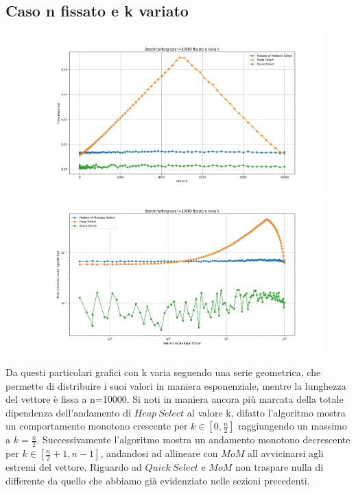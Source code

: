 \documentclass[a4paper]{article}
\begin{document}
\subsection{Caso n fissato e k variato}
\begin{figure}[h]
    \centering
    \includegraphics[width=.83\textwidth]{graphs/n_fisso/np.png}
    \includegraphics[width=.83\textwidth]{graphs/n_fisso/np2.png}
\end{figure}
Da questi particolari grafici con k varia seguendo una serie geometrica, che permette di distribuire i suoi valori in maniera esponenziale, mentre la lunghezza del vettore è fissa a n=10000. Si noti in maniera ancora più marcata della totale dipendenza dell'andamento di $Heap\ Select$ al valore k, difatto l'algoritmo mostra un comportamento monotono crescente per $k\in[0,\frac{n}{2}]$ raggiungendo un massimo a $k=\frac{n}{2}$. 
Successivamente l'algoritmo mostra un andamento monotono decrescente per $k\in[\frac{n}{2}+1,n-1]$, andandosi ad allineare con $MoM$ all avvicinarsi agli estremi del vettore. Riguardo ad $Quick\ Select$ e $MoM$ non traspare nulla di differente da quello che abbiamo già evidenziato nelle sezioni precedenti.\\
\newpage
\end{document}
